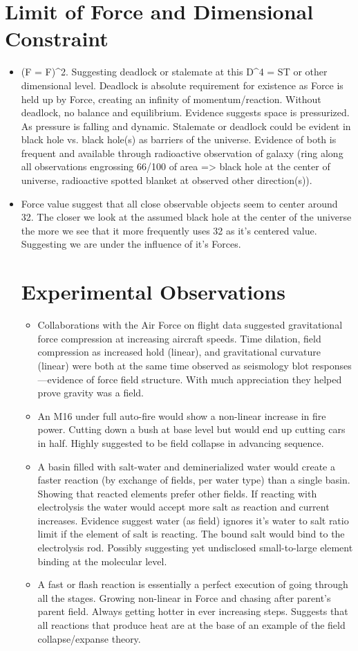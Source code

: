 \documentclass[12pt]{article}
\begin{document}
\section{Limit of Force and Dimensional Constraint}
\begin{itemize}
	\item (F = F)^2. Suggesting deadlock or stalemate at this D^4 = ST or other dimensional level. Deadlock is absolute requirement for existence as Force is held up by Force, creating an infinity of momentum/reaction. Without deadlock, no balance and equilibrium. Evidence suggests space is pressurized. As pressure is falling and dynamic. Stalemate or deadlock could be evident in black hole vs. black hole(s) as barriers of the universe. Evidence of both is frequent and available through radioactive observation of galaxy (ring along all observations engrossing 66/100 of area => black hole at the center of universe, radioactive spotted blanket at observed other direction(s)).
	
	\item Force value suggest that all close observable objects seem to center around 32. The closer we look at the assumed black hole at the center of the universe the more we see that it more frequently uses 32 as it's centered value. Suggesting we are under the influence of it's Forces.  
	

\section{Experimental Observations}
\begin{itemize}
\item Collaborations with the Air Force on flight data suggested gravitational force compression at increasing aircraft speeds. Time dilation, field compression as increased hold (linear), and gravitational curvature (linear) were both at the same time observed as seismology blot responses—evidence of force field structure. With much appreciation they helped prove gravity was a field.
\item An M16 under full auto-fire would show a non-linear increase in fire power. Cutting down a bush at base level but would end up cutting cars in half. Highly suggested to be field collapse in advancing sequence.
\item A basin filled with salt-water and deminerialized water would create a faster reaction (by exchange of fields, per water type) than a single basin. Showing that reacted elements prefer other fields. If reacting with electrolysis the water would accept more salt as reaction and current increases. Evidence suggest water (as field) ignores it's water to salt ratio limit if the element of salt is reacting. The bound salt would bind to the electrolysis rod. Possibly suggesting yet undisclosed small-to-large element binding at the molecular level.
\item A fast or flash reaction is essentially a perfect execution of going through all the stages. Growing non-linear in Force and chasing after parent's parent field. Always getting hotter in ever increasing steps. Suggests that all reactions that produce heat are at the base of an example of the field collapse/expanse theory.


\end{itemize}
\end{itemize}
\end{document}
